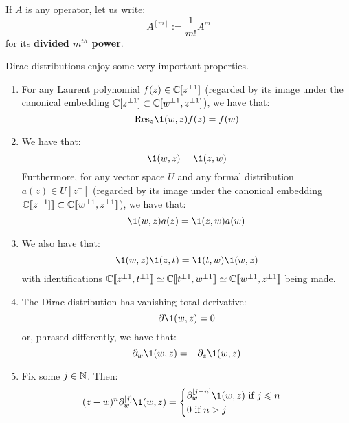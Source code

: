         \begin{convention}
            If $A$ is any operator, let us write:
                $$A^{[m]} := \frac{1}{m!} A^m$$
            for its \textbf{divided $m^{th}$ power}.
        \end{convention}
        \begin{lemma} \label{lemma: basic_properties_of_dirac_distributions}
            Dirac distributions enjoy some very important properties.
            \begin{enumerate}
                \item For any Laurent polynomial $f(z) \in \mathbb{C}[z^{\pm 1}]$ (regarded by its image under the canonical embedding $\mathbb{C}[z^{\pm 1}] \subset \mathbb{C}[w^{\pm 1}, z^{\pm 1}]$), we have that:
                    $$\Res_z \1(w, z) f(z) = f(w)$$
                \item We have that:
                    $$\1(w, z) = \1(z, w)$$
                Furthermore, for any vector space $U$ and any formal distribution $a(z) \in U[z^{\pm}]$ (regarded by its image under the canonical embedding $\mathbb{C}[\![z^{\pm 1}]]\!] \subset \mathbb{C}[\![w^{\pm 1}, z^{\pm 1}]\!]$), we have that:
                    $$\1(w, z) a(z) = \1(z, w) a(w)$$
                \item We also have that:
                    $$\1(w, z) \1(z, t) = \1(t, w) \1(w, z)$$
                with identifications $\mathbb{C}[\![z^{\pm 1}, t^{\pm 1}]\!] \simeq \mathbb{C}[\![t^{\pm 1}, w^{\pm 1}]\!] \simeq \mathbb{C}[\![w^{\pm 1}, z^{\pm 1}]\!]$ being made.
                \item The Dirac distribution has vanishing total derivative:
                    $$\del \1(w, z) = 0$$
                or, phrased differently, we have that:
                    $$\del_w \1(w, z) = -\del_z \1(w, z)$$
                \item Fix some $j \in \mathbb{N}$. Then:
                    $$
                        (z - w)^n \del_w^{[j]} \1(w, z) =
                        \begin{cases}
                            \text{$\del_w^{[j - n]} \1(w, z)$ if $j \leq n$}
                            \\
                            \text{$0$ if $n > j$}
                        \end{cases}
                    $$
            \end{enumerate}
        \end{lemma}

